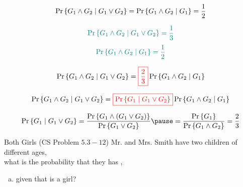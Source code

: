 \begin{frame}{}

  \centerline{}

  \pause
  \[
    \Pr\left\{G_1 \land G_2 \mid G_1 \lor G_2\right\} = \Pr\left\{G_1 \land G_2 \mid G_1\right\} = \frac{1}{2}
  \]
\end{frame}

\begin{frame}{}
  \[
    \textcolor{teal}{\Pr\left\{G_1 \land G_2 \mid G_1 \lor G_2\right\} = \frac{1}{3}}
  \]
  \[
    \textcolor{teal}{\Pr\left\{G_1 \land G_2 \mid G_1\right\} = \frac{1}{2}}
  \]

  \pause
  \[
    \Pr\left\{G_1 \land G_2 \mid G_1 \lor G_2\right\} = \textcolor{red}{\boxed{\frac{2}{3}}} \Pr\left\{G_1 \land G_2 \mid G_1\right\}
  \]

  \pause
  \[
    \Pr\left\{G_1 \land G_2 \mid G_1 \lor G_2\right\} = \textcolor{red}{\boxed{\Pr\left\{G_1 \mid G_1 \lor G_2\right\}}} \Pr\left\{G_1 \land G_2 \mid G_1\right\}
  \]

  \pause
  \[
    \Pr\set{G_1 \mid G_1 \lor G_2} = \frac{\Pr\set{G_1 \land (G_1 \lor G_2)}}{\Pr\set{G_1 \lor G_2}} 
    \pause = \frac{\Pr\set{G_1}}{\Pr\set{G_1 \land G_2}} = \frac{2}{3}
  \]
\end{frame}

\begin{frame}{}

  \pause
\end{frame}

\begin{frame}{}
  \begin{exampleblock}{Both Girls (CS Problem $5.3-12$)}
    Mr. and Mrs. Smith have two children of different ages,\\
    what is the probability that they has ,
    \begin{enumerate}[(a)]
      \item given that  is a girl?
    \end{enumerate}
  \end{exampleblock}

  \pause
  \vspace{0.50cm}
  \centerline{}
\end{frame}

